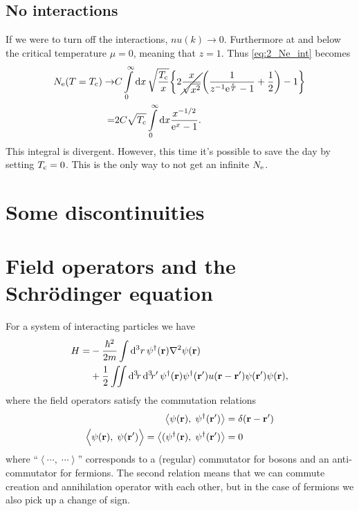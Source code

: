 \documentclass[11pt,letter, swedish, english
]{article}
\renewcommand{\thesubsection}{\arabic{section} (\alph{subsection})}
\begin{document}
\subsection*{No interactions}
If we were to turn off the interactions, $nu(k)\to0$. Furthermore at
and below the critical temperature $\mu=0$, meaning that $z=1$. Thus 
\eqref{eq:2_Ne_int} becomes
\begin{equation}
\begin{aligned}
\Ne(T=\Tc)\to& C\int_0^\infty\rd{x}\,\sqrt{\frac{\Tc}{x}}
\qty{2\cancel{\frac{x}{\sqrt{x^2}}}
\qty(\frac{1}{z^{-1}\ee^{\frac{\epsilon}{T}}-1}+\frac{1}{2})-1}\\
=&2C\sqrt{\Tc} \int_0^\infty\rd{x}
\frac{x^{-1/2}}{\ee^{x}-1}.
\end{aligned}
\end{equation}
This integral is divergent. However, this time it's possible to save
the day by setting $T_{\text{c}}=0$. This is the only way to not get an
infinite $N_{\text{e}}$.

\section{Some discontinuities}
\renewcommand{\thesubsection}{\arabic{section} (\alph{subsection})}



\section{Field operators and the Schrödinger equation}
\newcommand{\scomm}[2]{\left\langle#1,\;#2\right\rangle}
\newcommand{\Scomm}[2]{\langle#1,\;#2\rangle}
\newcommand{\commute}[1]{\overbrace{#1}^{\text{commute}}}
For a system of interacting particles we have
\begin{equation}\label{eq:4_want_this}
\begin{aligned}
H=&-\frac{\hbar^2}{2m}\int\rd^3r\,
\psi^\dagger(\vb{r})\laplacian\psi(\vb{r})\\
&+\frac{1}{2}\iint\rd^3\!r\,\rd^3\!r'\,
\psi^\dagger(\vb{r})\psi^\dagger(\vb{r}')
u(\vb{r}-\vb{r}')\psi(\vb{r}')\psi(\vb{r}),
\end{aligned}
\end{equation}
where the field operators satisfy the commutation relations
\begin{equation}\label{eq:4_comm}
\begin{aligned}
\scomm{\psi(\vb{r})}{\psi^\dagger(\vb{r}')}
&=\delta(\vb{r}-\vb{r}')\\
\scomm{\psi(\vb{r})}{\psi(\vb{r}')\Big.}=
\scomm{(\psi^\dagger(\vb{r})}{\psi^\dagger(\vb{r}')}&=0
\end{aligned}
\end{equation}
where ``$\scomm{\cdots}{\cdots}$'' corresponds to a (regular)
commutator for bosons and an anti-commutator for fermions. The second
relation means that we can commute creation and annihilation operator
with each other, but in the case of fermions we also pick up a change
of sign. 
\end{document}
